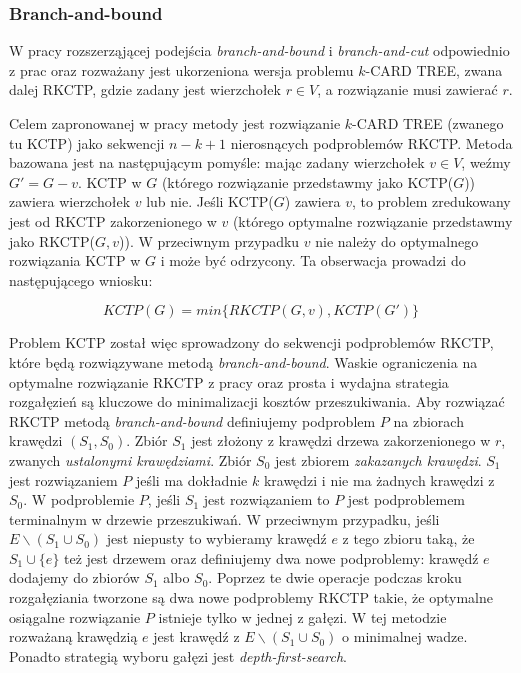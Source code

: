 \documentclass[12pt]{article}
\begin{document}
\subsubsection{Branch-and-bound}

W pracy \cite{branch_and_bound} rozszerząjącej podejścia \textit{branch-and-bound} i \textit{branch-and-cut} odpowiednio z prac \cite{integer} oraz \cite{fast} rozważany jest ukorzeniona wersja problemu $k$-CARD TREE, zwana dalej RKCTP, gdzie zadany jest wierzchołek $r \in V$, a rozwiązanie musi zawierać $r$. 

Celem zapronowanej w pracy metody jest rozwiązanie $k$-CARD TREE (zwanego tu KCTP) jako sekwencji $n-k+1$ nierosnących podproblemów RKCTP. Metoda bazowana jest na następującym pomyśle: mając zadany wierzchołek $v \in V$, weźmy $G' = G - v$. KCTP w $G$ (którego rozwiązanie przedstawmy jako KCTP($G$)) zawiera wierzchołek $v$ lub nie. Jeśli KCTP($G$) zawiera $v$, to problem zredukowany jest od RKCTP zakorzenionego w $v$ (którego optymalne rozwiązanie przedstawmy jako RKCTP($G,v$)). W przeciwnym przypadku $v$ nie należy do optymalnego rozwiązania KCTP w $G$ i może być odrzycony. Ta obserwacja prowadzi do następującego wniosku:

\[KCTP(G) = min\{RKCTP(G,v), KCTP(G')\}\]

Problem KCTP został więc sprowadzony do sekwencji podproblemów RKCTP, które będą rozwiązywane metodą \textit{branch-and-bound}. Waskie ograniczenia na optymalne rozwiązanie RKCTP z pracy \cite{rooted} oraz prosta i wydajna strategia rozgałęzień są kluczowe do minimalizacji kosztów przeszukiwania.
Aby rozwiązać RKCTP metodą \textit{branch-and-bound} definiujemy podproblem $P$ na zbiorach krawędzi $(S_1, S_0)$. Zbiór $S_1$ jest złożony z krawędzi drzewa zakorzenionego w $r$, zwanych \textit{ustalonymi krawędziami}. Zbiór $S_0$ jest zbiorem \textit{zakazanych krawędzi}. $S_1$ jest rozwiązaniem $P$ jeśli ma dokładnie $k$ krawędzi i nie ma żadnych krawędzi z $S_0$. W podproblemie $P$, jeśli $S_1$ jest rozwiązaniem to $P$ jest podproblemem terminalnym w drzewie przeszukiwań. W przeciwnym przypadku, jeśli $E\backslash(S_1 \cup S_0)$ jest niepusty to wybieramy krawędź $e$ z tego zbioru taką, że $S_1 \cup \{e\}$ też jest drzewem oraz definiujemy dwa nowe podproblemy: krawędź $e$ dodajemy do zbiorów $S_1$ albo $S_0$. Poprzez te dwie operacje podczas kroku rozgałęziania tworzone są dwa nowe podproblemy RKCTP takie, że optymalne osiągalne rozwiązanie $P$ istnieje tylko w jednej z gałęzi. W tej metodzie rozważaną krawędzią $e$ jest krawędź z $E\backslash(S_1 \cup S_0)$ o minimalnej wadze. Ponadto strategią wyboru gałęzi jest \textit{depth-first-search}.
\end{document}
